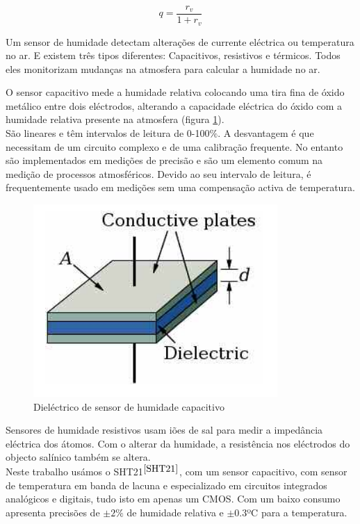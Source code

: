 \documentclass[12pt]{article}
\begin{document}
\begin{equation}
    q = \frac{r_v}{1 + r_v}
\end{equation}

\par Um sensor de humidade detectam alterações de currente eléctrica ou temperatura no ar. E existem três tipos diferentes: Capacitivos, resistivos e térmicos. Todos eles monitorizam mudanças na atmosfera para calcular a humidade no ar.\\
\par O sensor capacitivo mede a humidade relativa colocando uma tira fina de óxido metálico entre dois eléctrodos, alterando a capacidade eléctrica do óxido com a humidade relativa presente na atmosfera (figura \ref{fig:humid_capac}).\\
São lineares e têm intervalos de leitura de 0-100$\%$. A desvantagem é que necessitam de um circuito complexo e de uma calibração frequente. No entanto são implementados em medições de precisão e são um elemento comum na medição de processos atmosféricos. Devido ao seu intervalo de leitura, é frequentemente usado em medições sem uma compensação activa de temperatura.

\begin{figure}[H]
        \centering
        \includegraphics[width=0.4\linewidth]{imgs/capa_humid.png}
        \caption{Dieléctrico de sensor de humidade capacitivo}
        \label{fig:humid_capac}
\end{figure}

\par Sensores de humidade resistivos usam iões de sal para medir a impedância eléctrica dos átomos. Com o alterar da humidade, a resistência nos eléctrodos do objecto salínico também se altera.\\

Neste trabalho usámos o SHT21$^{\cite{SHT21}}$, com um sensor capacitivo, com sensor de temperatura em banda de lacuna e especializado em circuitos integrados analógicos e digitais, tudo isto em apenas um CMOS. Com um baixo consumo apresenta precisões de $\pm2\%$ de humidade relativa e $\pm$0.3ºC para a temperatura.
\end{document}
